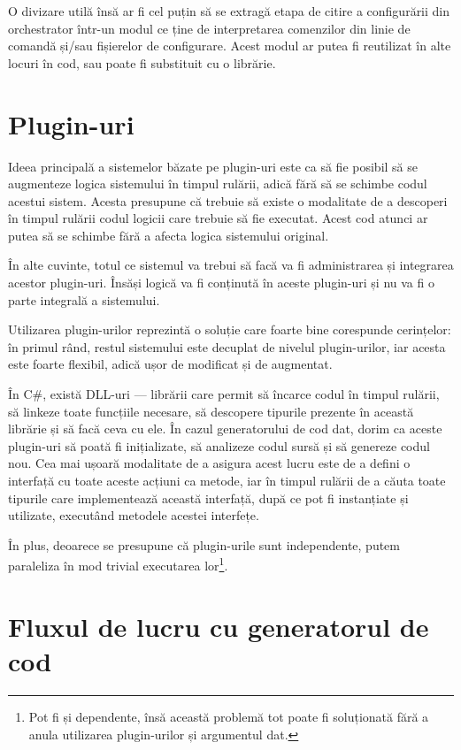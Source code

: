 \documentclass[a4paper,12pt]{report}
\begin{document}
O divizare utilă însă ar fi cel puțin să se extragă etapa de citire a configurării din orchestrator într-un modul ce ține de interpretarea comenzilor din linie de comandă și/sau fișierelor de configurare.
Acest modul ar putea fi reutilizat în alte locuri în cod, sau poate fi substituit cu o librărie.

\section{Plugin-uri}

Ideea principală a sistemelor băzate pe plugin-uri este ca să fie posibil să se augmenteze logica sistemului în timpul rulării, adică fără să se schimbe codul acestui sistem.
Acesta presupune că trebuie să existe o modalitate de a descoperi în timpul rulării codul logicii care trebuie să fie executat.
Acest cod atunci ar putea să se schimbe fără a afecta logica sistemului original.

În alte cuvinte, totul ce sistemul va trebui să facă va fi administrarea și integrarea acestor plugin-uri.
Însăși logică va fi conținută în aceste plugin-uri și nu va fi o parte integrală a sistemului.

Utilizarea plugin-urilor reprezintă o soluție care foarte bine corespunde cerințelor: în primul rând, restul sistemului este decuplat de nivelul plugin-urilor, iar acesta este foarte flexibil, adică ușor de modificat și de augmentat.

În C\#, există \ac{DLL}-uri --- librării care permit să încarce codul în timpul rulării, să linkeze toate funcțiile necesare, să descopere tipurile prezente în această librărie și să facă ceva cu ele.
În cazul generatorului de cod dat, dorim ca aceste plugin-uri să poată fi inițializate, să analizeze codul sursă și să genereze codul nou.
Cea mai ușoară modalitate de a asigura acest lucru este de a defini o interfață cu toate aceste acțiuni ca metode, iar în timpul rulării de a căuta toate tipurile care implementează această interfață, după ce pot fi instanțiate și utilizate, executând metodele acestei interfețe.

În plus, deoarece se presupune că plugin-urile sunt independente, putem paraleliza în mod trivial executarea lor\footnote{Pot fi și dependente, însă această problemă tot poate fi soluționată fără a anula utilizarea plugin-urilor și argumentul dat.}.

\section{Fluxul de lucru cu generatorul de cod}
\end{document}
